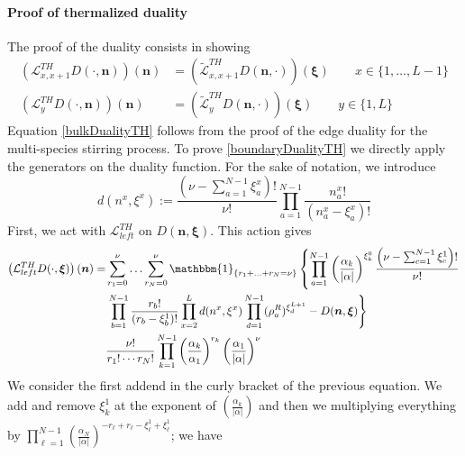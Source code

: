 \documentclass[10pt]{article}
\numberwithin{equation}{section}
\numberwithin{equation}{subsection}
\begin{document}
\paragraph{Proof of thermalized duality}
The proof of the duality consists in showing
\begin{align}
	\left(\mathcal{L}_{x,x+1}^{TH}D(\cdot,\bm{n})\right)(\bm{n})&=\left(\widetilde{\mathcal{L}}_{x,x+1}^{TH}D(\bm{n},\cdot)\right)(\bm{\xi})\qquad x\in \{1,\ldots,L-1\}\label{bulkDualityTH}\\
	\left(\mathcal{L}_{y}^{TH}D(\cdot,\bm{n})\right)(\bm{n})&=\left(\widetilde{\mathcal{L}}_{y}^{TH}D(\bm{n},\cdot)\right)(\bm{\xi})\qquad y\in\{1,L\}\label{boundaryDualityTH}
\end{align}
Equation \eqref{bulkDualityTH} follows from the proof of the edge duality for the multi-species stirring process. To prove \eqref{boundaryDualityTH} we directly apply the generators on the duality function. For the sake of notation, we introduce 
\begin{equation}
	d(n^{x},\xi^{x}):=\frac{(\nu-\sum_{a=1}^{N-1}\xi_{a}^{x})!}{\nu!}\prod_{a=1}^{N-1}\frac{n_{a}^{x}!}{(n_{a}^{x}-\xi_{a}^{x})!}
\end{equation}
First, we act with $\mathcal{L}_{left}^{TH}$ on $D(\bm{n},\bm{\xi})$. This action gives
\begin{align}\label{ProvaBordoTH}
	\left(\mathcal{L}_{left}^{TH}D(\cdot,\bm{\xi})\right)(\bm{n})=\nonumber&\sum_{r_{1}=0}^{\nu}\ldots\sum_{r_{N}=0}^{\nu}\mathbbm{1}_{\{r_{1}+\ldots+r_{N}=\nu\}}\left\{\prod_{a=1}^{N-1}\left(\frac{\alpha_{k}}{|\alpha|}\right)^{\xi_{k}^{0}}\frac{\left(\nu-\sum_{c=1}^{N-1}\xi_{c}^{1}\right)!}{\nu!}\right.
	\\&\nonumber
	\left.\prod_{b=1}^{N-1}\frac{r_{b}!}{(r_{b}-\xi^{1}_{b})!}\prod_{x=2}^{L}d(n^{x},\xi^{x})\prod_{d=1}^{N-1}(\rho_{a}^{R})^{\xi_{d}^{L+1}}-D(\bm{n},\bm{\xi})\right\}
	\\&
	\frac{\nu!}{r_{1}!\cdots r_{N}!}\prod_{k=1}^{N-1}\left(\frac{\alpha_{k}}{\alpha_{1}}\right)^{r_{k}}\left(\frac{\alpha_{1}}{|\alpha|}\right)^{\nu}
\end{align}
We consider the first addend in the curly bracket of the previous equation. We add and remove $\xi_{k}^{1}$ at the exponent of $\left(\frac{\alpha_{k}}{|\alpha|}\right)$ and then we multiplying everything by $\prod_{\ell=1}^{N-1}\left(\frac{\alpha_{N}}{|\alpha|}\right)^{-r_{\ell}+r_{\ell}-\xi_{\ell}^{1}+\xi_{\ell}^{1}}$; we have
\end{document}
